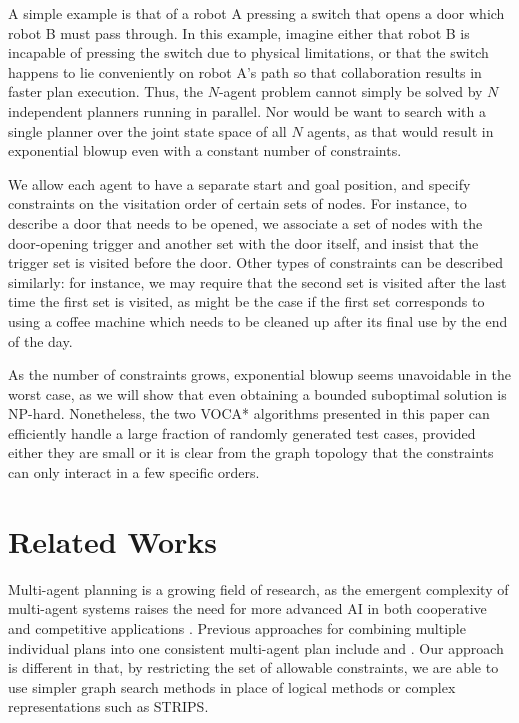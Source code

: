 \documentclass[letterpaper]{article}
\begin{document}
A simple example is that of a robot A pressing a switch that opens a door which robot B must pass through. In this example, imagine either that robot B is incapable of pressing the switch due to physical limitations, or that the switch happens to lie conveniently on robot A's path so that collaboration results in faster plan execution. Thus, the $N$-agent problem cannot simply be solved by $N$ independent planners running in parallel. Nor would be want to search with a single planner over the joint state space of all $N$ agents, as that would result in exponential blowup even with a constant number of constraints.

We allow each agent to have a separate start and goal position, and specify constraints on the visitation order of certain sets of nodes. For instance, to describe a door that needs to be opened, we associate a set of nodes with the door-opening trigger and another set with the door itself, and insist that the trigger set is visited before the door. Other types of constraints can be described similarly: for instance, we may require that the second set is visited after the last time the first set is visited, as might be the case if the first set corresponds to using a coffee machine which needs to be cleaned up after its final use by the end of the day.

As the number of constraints grows, exponential blowup seems unavoidable in the worst case, as we will show that even obtaining a bounded suboptimal solution is NP-hard. Nonetheless, the two VOCA* algorithms presented in this paper can efficiently handle a large fraction of randomly generated test cases, provided either they are small or it is clear from the graph topology that the constraints can only interact in a few specific orders.

\section{Related Works}

Multi-agent planning is a growing field of research, as the emergent complexity of multi-agent systems raises the need for more advanced AI in both cooperative and competitive applications \cite{van2008multi}. Previous approaches for combining multiple individual plans into one consistent multi-agent plan include \cite{georgeff1988communication} and \cite{de2005multi}. Our approach is different in that, by restricting the set of allowable constraints, we are able to use simpler graph search methods in place of logical methods or complex representations such as STRIPS.
\end{document}
